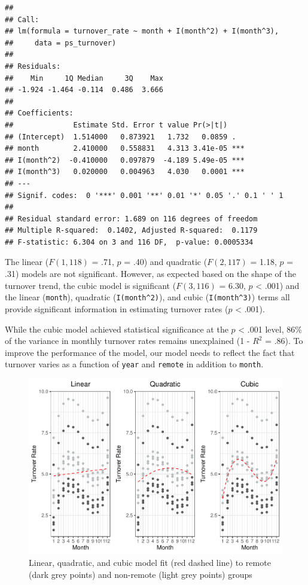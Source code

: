 \documentclass[
]{book}
\begin{document}
\begin{verbatim}
## 
## Call:
## lm(formula = turnover_rate ~ month + I(month^2) + I(month^3), 
##     data = ps_turnover)
## 
## Residuals:
##    Min     1Q Median     3Q    Max 
## -1.924 -1.464 -0.114  0.486  3.666 
## 
## Coefficients:
##              Estimate Std. Error t value Pr(>|t|)    
## (Intercept)  1.514000   0.873921   1.732   0.0859 .  
## month        2.410000   0.558831   4.313 3.41e-05 ***
## I(month^2)  -0.410000   0.097879  -4.189 5.49e-05 ***
## I(month^3)   0.020000   0.004963   4.030   0.0001 ***
## ---
## Signif. codes:  0 '***' 0.001 '**' 0.01 '*' 0.05 '.' 0.1 ' ' 1
## 
## Residual standard error: 1.689 on 116 degrees of freedom
## Multiple R-squared:  0.1402, Adjusted R-squared:  0.1179 
## F-statistic: 6.304 on 3 and 116 DF,  p-value: 0.0005334
\end{verbatim}

The linear (\(F(1,118)\) = .71, \(p\) = .40) and quadratic (\(F(2,117)\) = 1.18, \(p\) = .31) models are not significant. However, as expected based on the shape of the turnover trend, the cubic model is significant (\(F(3,116)\) = 6.30, \(p\) \textless{} .001) and the linear (\texttt{month}), quadratic (\texttt{I(month\^{}2)}), and cubic (\texttt{I(month\^{}3)}) terms all provide significant information in estimating turnover rates (\(p\) \textless{} .001).

While the cubic model achieved statistical significance at the \(p\) \textless{} .001 level, 86\% of the variance in monthly turnover rates remains unexplained (1 - \(R^2\) = .86). To improve the performance of the model, our model needs to reflect the fact that turnover varies as a function of \texttt{year} and \texttt{remote} in addition to \texttt{month}.

\begin{figure}

{\centering \includegraphics[width=1\linewidth]{The_Fundamentals_of_People_Analytics_files/figure-latex/turnover-pred-1} 

}

\caption{Linear, quadratic, and cubic model fit (red dashed line) to remote (dark grey points) and non-remote (light grey points) groups}\label{fig:turnover-pred}
\end{figure}
\end{document}
